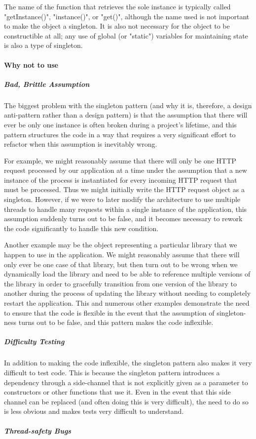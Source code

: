 \documentclass{book}
\begin{document}
The name of the function that retrieves the sole instance is typically called "getInstance()", "instance()", or "get()", although the name used is not important to make the object a singleton. 
It is also not necessary for the object to be constructible at all; any use of global (or "static") variables for maintaining state is also a type of singleton.
\paragraph{Why not to use}
\subparagraph{Bad, Brittle Assumption}
The biggest problem with the singleton pattern (and why it is, therefore, a design anti-pattern rather than a design pattern) is that the assumption that
there will ever be only one instance is often broken during a project's lifetime, and this pattern structures the code in a way that requires a very significant effort to refactor
when this assumption is inevitably wrong.

For example, we might reasonably assume that there will only be one HTTP request processed by our application at a time
under the assumption that a new instance of the process is instantiated for every incoming HTTP request that must be processed.
Thus we might initially write the HTTP request object as a singleton.
However, if we were to later modify the architecture to use multiple threads to handle many requests within a single instance of the application,
this assumption suddenly turns out to be false, and it becomes necessary to rework the code significantly to handle this new condition.

Another example may be the object representing a particular library that we happen to use in the application.
We might reasonably assume that there will only ever be one case of that library,
but then turn out to be wrong when we dynamically load the library and need to be able to reference multiple versions of the library
in order to gracefully transition from one version of the library to another during the process of updating the library without needing to completely restart the application.
This and numerous other examples demonstrate the need to ensure that the code is flexible in the event that the assumption of singleton-ness turns out to be false,
and this pattern makes the code inflexible.
\subparagraph{Difficulty Testing}

In addition to making the code inflexible, the singleton pattern also makes it very difficult to test code.
This is because the singleton pattern introduces a dependency through a side-channel that is not explicitly given as a parameter to constructors or other functions that use it.
Even in the event that this side channel can be replaced (and often doing this is very difficult), the need to do so is less obvious and makes tests very difficult to understand.
\subparagraph{Thread-safety Bugs}
\end{document}
